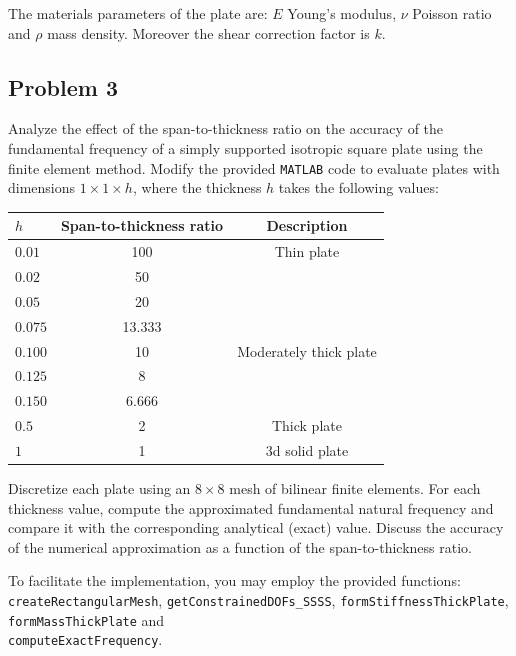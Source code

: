 \documentclass[12pt]{article}
\begin{document}
The materials parameters of the plate are: $E$ Young's modulus, $\nu$ Poisson ratio and $\rho$ mass density. Moreover the shear correction factor is $k$.


\subsection*{Problem 3}
Analyze the effect of the span-to-thickness ratio on the accuracy of the fundamental frequency of a simply supported isotropic square plate using the finite element method. Modify the provided \texttt{MATLAB} code to evaluate plates with dimensions $1 \times 1 \times h$, where the thickness $h$ takes the following values:
{\small
\begin{table}[h!]
  \centering
  \begin{tabular}{l|c|c}
    \hline
    $h$     & Span-to-thickness ratio & Description            \\
    \hline
    $0.01$  & 100                     & Thin plate             \\
    $0.02$  & 50                      &                        \\
    $0.05$  & 20                      &                        \\
    $0.075$ & 13.333                  &                        \\
    $0.100$ & 10                      & Moderately thick plate \\
    $0.125$ & 8                       &                        \\
    $0.150$ & 6.666                   &                        \\
    $0.5$   & 2                       & Thick plate            \\
    $1$     & 1                       & 3d solid plate         \\
    \hline
  \end{tabular}
\end{table}
}

Discretize each plate using an $8 \times 8$ mesh of bilinear finite elements. For each thickness value, compute the approximated fundamental natural frequency and compare it with the corresponding analytical (exact) value. Discuss the accuracy of the numerical approximation as a function of the span-to-thickness ratio.

To facilitate the implementation, you may employ the provided functions: \texttt{createRectangularMesh}, \texttt{getConstrainedDOFs\_SSSS}, \texttt{formStiffnessThickPlate}, \texttt{formMassThickPlate} and \\ \texttt{computeExactFrequency}.
\end{document}

